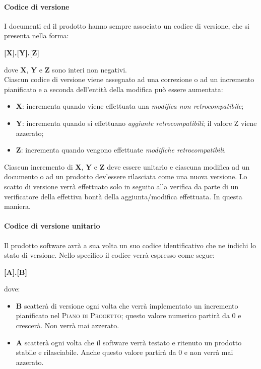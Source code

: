\paragraph{Codice di versione}
\label{par:codice_versione}

I documenti ed il prodotto hanno sempre associato un codice di versione, che si presenta nella forma:
\begin{center}
    \textbf{[X].[Y].[Z]}
\end{center}
dove \textbf{X}, \textbf{Y} e \textbf{Z} sono interi non negativi.\\
Ciascun codice di versione viene assegnato ad una correzione o ad un incremento pianificato e a seconda dell'entit\`{a} della modifica
pu\`{o} essere aumentata:
\begin{itemize}
	\item \textbf{X}: incrementa quando viene effettuata una \emph{modifica non retrocompatibile};
	\item \textbf{Y}: incrementa quando si effettuano \emph{aggiunte  retrocompatibili}; il valore Z viene azzerato;
	\item \textbf{Z}: incrementa quando vengono effettuate \emph{modifiche retrocompatibili}. 
\end{itemize}
Ciascun incremento di \textbf{X}, \textbf{Y} e \textbf{Z} deve essere unitario e ciascuna modifica ad un documento o ad un prodotto
dev'essere rilasciata come una nuova versione.
Lo scatto di versione verrà effettuato solo in seguito alla verifica da parte di un verificatore della effettiva bontà della aggiunta/modifica effettuata. In questa maniera.

\paragraph{Codice di versione unitario}
Il prodotto software avrà a sua volta un suo codice identificativo che ne indichi lo stato di versione. Nello specifico il codice verrà espresso come segue:\\
\begin{center}
    \textbf{[A].[B]}
\end{center}

dove:
\begin{itemize}
\item \textbf{B} scatterà di versione ogni volta che verrà implementato un incremento pianificato nel \textsc{Piano di Progetto}; questo valore numerico partirà da 0 e crescerà. Non verrà mai azzerato.
\item \textbf{A} scatterà ogni volta che il software verrà testato e ritenuto un prodotto stabile e rilasciabile. Anche questo valore partirà da 0 e non verrà mai azzerato.
\end{itemize}

